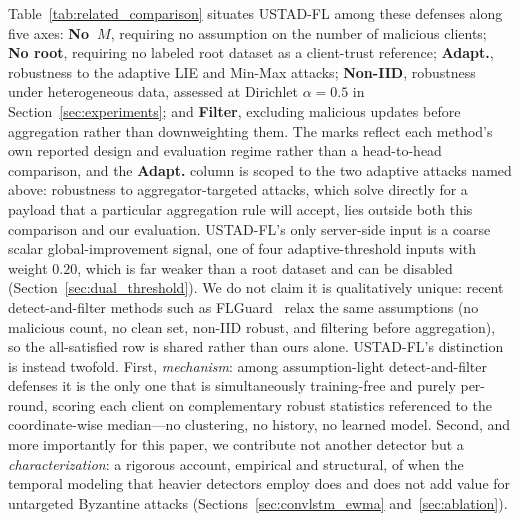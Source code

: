\documentclass[journal]{IEEEtran}
\begin{document}
Table~\ref{tab:related_comparison} situates USTAD-FL among these defenses along five axes: \textbf{No~$M$}, requiring no assumption on the number of malicious clients; \textbf{No root}, requiring no labeled root dataset as a client-trust reference; \textbf{Adapt.}, robustness to the adaptive LIE and Min-Max attacks; \textbf{Non-IID}, robustness under heterogeneous data, assessed at Dirichlet $\alpha=0.5$ in Section~\ref{sec:experiments}; and \textbf{Filter}, excluding malicious updates before aggregation rather than downweighting them. The marks reflect each method's own reported design and evaluation regime rather than a head-to-head comparison, and the \textbf{Adapt.} column is scoped to the two adaptive attacks named above: robustness to aggregator-targeted attacks, which solve directly for a payload that a particular aggregation rule will accept, lies outside both this comparison and our evaluation. USTAD-FL's only server-side input is a coarse scalar global-improvement signal, one of four adaptive-threshold inputs with weight $0.20$, which is far weaker than a root dataset and can be disabled (Section~\ref{sec:dual_threshold}). We do not claim it is qualitatively unique: recent detect-and-filter methods such as FLGuard~\cite{lee2023flguard} relax the same assumptions (no malicious count, no clean set, non-IID robust, and filtering before aggregation), so the all-satisfied row is shared rather than ours alone. USTAD-FL's distinction is instead twofold. First, \emph{mechanism}: among assumption-light detect-and-filter defenses it is the only one that is simultaneously training-free and purely per-round, scoring each client on complementary robust statistics referenced to the coordinate-wise median---no clustering, no history, no learned model. Second, and more importantly for this paper, we contribute not another detector but a \emph{characterization}: a rigorous account, empirical and structural, of when the temporal modeling that heavier detectors employ does and does not add value for untargeted Byzantine attacks (Sections~\ref{sec:convlstm_ewma} and~\ref{sec:ablation}).
\end{document}
